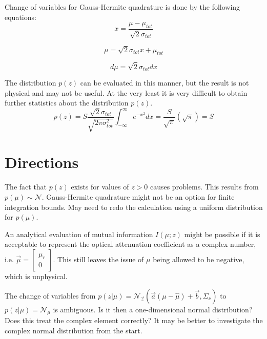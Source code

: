 \documentclass{article}         %
\theoremstyle{definition}
\theoremstyle{remark}
\begin{document}
Change of variables for Gauss-Hermite quadrature is done by the following equations:
\begin{equation}
	x = \frac{\mu - \mu_{tot}}{\sqrt{2}\sigma_{tot}}
\end{equation}

\begin{equation}
	\mu = \sqrt{2}\sigma_{tot}x + \mu_{tot}
\end{equation}

\begin{equation}
	d\mu = \sqrt{2}\sigma_{tot}dx
\end{equation}

The distribution $p\left(z\right)$ can be evaluated in this manner, but the result is not physical and may not be useful. At the very least it is very difficult to obtain further statistics about the distribution $p\left(z\right)$.
\begin{equation}
	p\left(z\right) = S\frac{\sqrt{2}\sigma_{tot}}{\sqrt{2\pi\sigma_{tot}^2}}\int_{-\infty}^\infty e^{-x^2}dx = \frac{S}{\sqrt{\pi}}\left(\sqrt{\pi}\right) = S
\end{equation}

\section{Directions}\label{Directions}

The fact that $p\left(z\right)$ exists for values of $z > 0$ causes problems. This results from $p\left(\mu\right)\sim\mathcal{N}$. Gauss-Hermite quadrature might not be an option for finite integration bounds. May need to redo the calculation using a uniform distribution for $p\left(\mu\right)$.

An analytical evaluation of mutual information $I\left(\mu;z\right)$ might be possible if it is acceptable to represent the optical attenuation coefficient as a complex number, i.e. $\vec{\mu} = \left[ \begin{array}{c} \mu_r \\ 0 \end{array} \right]$. This still leaves the issue of $\mu$ being allowed to be negative, which is unphysical.

The change of variables from $p\left(z|\mu\right) = \mathcal{N}_{\vec{z}}\left(\vec{a}\left(\mu-\hat{\mu}\right)+\vec{b},\Sigma_\nu\right)$ to $p\left(z|\mu\right) = \mathcal{N}_\mu$ is ambiguous. Is it then a one-dimensional normal distribution? Does this treat the complex element correctly? It may be better to investigate the complex normal distribution from the start.
\end{document}

